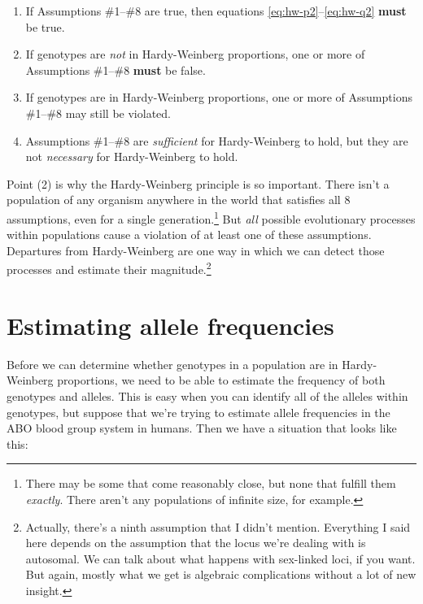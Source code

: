 \documentclass[12pt]{article}
\begin{document}
\begin{enumerate}

\item If Assumptions \#1--\#8 are true, then equations
  \ref{eq:hw-p2}--\ref{eq:hw-q2} {\bf must} be true.

\item If genotypes are {\it not\/} in Hardy-Weinberg proportions, one
  or more of Assumptions \#1--\#8 {\bf must} be false.

\item If genotypes are in Hardy-Weinberg proportions, one or more of
  Assumptions \#1--\#8 may still be violated.

\item Assumptions \#1--\#8 are {\it sufficient\/} for Hardy-Weinberg
  to hold, but they are not {\it necessary\/} for Hardy-Weinberg to
  hold.

\end{enumerate}

Point (2) is why the Hardy-Weinberg principle is so important. There
isn't a population of any organism anywhere in the world that
satisfies all 8 assumptions, even for a single
generation.\footnote{There may be some that come reasonably close, but
  none that fulfill them {\it exactly}. There aren't any populations
  of infinite size, for example.}  But {\it all\/} possible
evolutionary processes within populations cause a violation of at
least one of these assumptions. Departures from Hardy-Weinberg are one
way in which we can detect those processes and estimate their
magnitude.\footnote{Actually, there's a ninth assumption that I didn't
  mention. Everything I said here depends on the assumption that the
  locus we're dealing with is autosomal. We can talk about what
  happens with sex-linked loci, if you want. But again, mostly what we
  get is algebraic complications without a lot of new insight.}

\section*{Estimating allele frequencies}

Before we can determine whether genotypes in a population are in
Hardy-Weinberg proportions, we need to be able to estimate the
frequency of both genotypes and alleles. This is easy when you can
identify all of the alleles within genotypes, but suppose that we're
trying to estimate allele frequencies in the ABO blood group system in
humans. Then we have a situation that looks like this:
\end{document}
